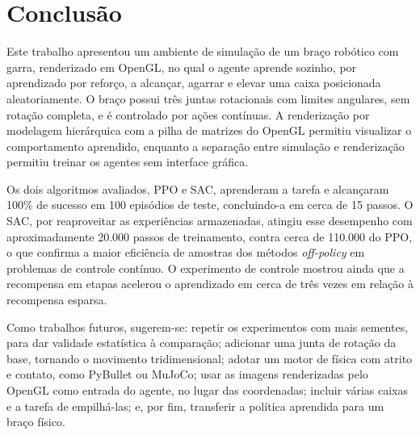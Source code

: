 \documentclass[conference]{IEEEtran}
\begin{document}
\section{Conclusão}

Este trabalho apresentou um ambiente de simulação de um braço robótico com garra, renderizado em OpenGL, no qual o agente aprende sozinho, por aprendizado por reforço, a alcançar, agarrar e elevar uma caixa posicionada aleatoriamente. O braço possui três juntas rotacionais com limites angulares, sem rotação completa, e é controlado por ações contínuas. A renderização por modelagem hierárquica com a pilha de matrizes do OpenGL permitiu visualizar o comportamento aprendido, enquanto a separação entre simulação e renderização permitiu treinar os agentes sem interface gráfica.

Os dois algoritmos avaliados, PPO e SAC, aprenderam a tarefa e alcançaram 100\% de sucesso em 100 episódios de teste, concluindo-a em cerca de 15 passos. O SAC, por reaproveitar as experiências armazenadas, atingiu esse desempenho com aproximadamente 20.000 passos de treinamento, contra cerca de 110.000 do PPO, o que confirma a maior eficiência de amostras dos métodos \textit{off-policy} em problemas de controle contínuo. O experimento de controle mostrou ainda que a recompensa em etapas acelerou o aprendizado em cerca de três vezes em relação à recompensa esparsa.

Como trabalhos futuros, sugerem-se: repetir os experimentos com mais sementes, para dar validade estatística à comparação; adicionar uma junta de rotação da base, tornando o movimento tridimensional; adotar um motor de física com atrito e contato, como PyBullet ou MuJoCo; usar as imagens renderizadas pelo OpenGL como entrada do agente, no lugar das coordenadas; incluir várias caixas e a tarefa de empilhá-las; e, por fim, transferir a política aprendida para um braço físico.
\end{document}
